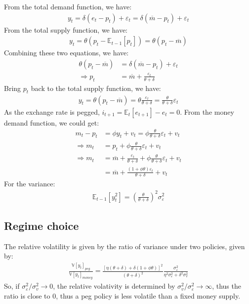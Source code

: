 \documentclass[a4paper,12pt]{article} %
\theoremstyle{nonitalic}
\begin{document}
From the total demand function, we have:
\begin{gather*}
    y_t = \delta (e_t - p_t) + \varepsilon_t = \delta (\overline{m} - p_t) + \varepsilon_t
\end{gather*}
From the total supply function, we have:
\begin{gather*}
    y_t = \theta (p_t - \mathbb{E}_{t-1}[p_t]) = \theta (p_t - \overline{m}) 
\end{gather*}
Combining these two equations, we have:
\begin{align*}
    \theta (p_t - \overline{m}) &= \delta (\overline{m} - p_t) + \varepsilon_t \\
    \Rightarrow p_t &= \overline{m} + \frac{\varepsilon_t}{\theta + \delta}   
\end{align*}
Bring $p_t$ back to the total supply function, we have:
\begin{gather*}
    y_t = \theta (p_t - \overline{m}) = \theta \frac{\varepsilon_t}{\theta + \delta} = \frac{\theta}{\theta + \delta} \varepsilon_t 
\end{gather*}
As the exchange rate is pegged, $i_{t+1} = \mathbb{E}_t[e_{t+1}] - e_t = 0$.
From the money demand function, we could get:
\begin{align*}
    m_t - p_t &= \phi y_t + v_t = \phi \frac{\theta}{\theta + \delta} \varepsilon_t + v_t \\
    \Rightarrow m_t &= p_t + \phi \frac{\theta}{\theta + \delta} \varepsilon_t + v_t \\
    \Rightarrow m_t &= \overline{m} + \frac{\varepsilon_t}{\theta + \delta} + \phi \frac{\theta}{\theta + \delta} \varepsilon_t + v_t \\
    &= \overline{m} + \frac{(1 + \phi \theta) \varepsilon_t}{\theta + \delta} + v_t
\end{align*}
For the variance:
\begin{gather*}
    \mathbb{E}_{t-1}[y_t^2] = \left( \frac{\theta}{\theta + \delta} \right)^2 \sigma_{\varepsilon}^2
\end{gather*}

\subsection{Regime choice}

The relative volatility is given by the ratio of variance under two policies, given by:
\begin{gather*}
    \frac{\mathbb{V}[y_t]_{peg}}{\mathbb{V}[y_t]_{money}} = \frac{\left[ \eta (\theta + \delta) + \delta (1 + \phi \theta) \right]^2}{(\theta + \delta)^2} \frac{\sigma_{\varepsilon}^2}{\eta^2 \sigma_{\varepsilon}^2 + \delta^2 \sigma_v^2}
\end{gather*}
So, if $\sigma_{\varepsilon}^2 / \sigma_v^2 \to 0$, the relative volativity is determined by $\sigma_v^2 / \sigma_{\varepsilon}^2 \to  \infty $, thus the ratio is close to 0,
thus a peg policy is less volatile than a fixed money supply.
\end{document}
